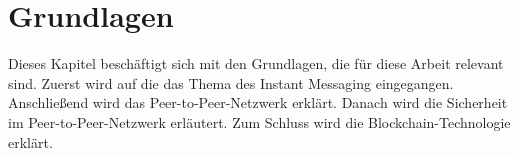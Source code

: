 \chapter{Grundlagen}
\label{chap:grundlagen}

Dieses Kapitel beschäftigt sich mit den Grundlagen, die für diese Arbeit relevant sind. Zuerst wird auf die das Thema des Instant Messaging eingegangen. Anschließend wird das Peer-to-Peer-Netzwerk erklärt. Danach wird die Sicherheit im Peer-to-Peer-Netzwerk erläutert. Zum Schluss wird die Blockchain-Technologie erklärt.








